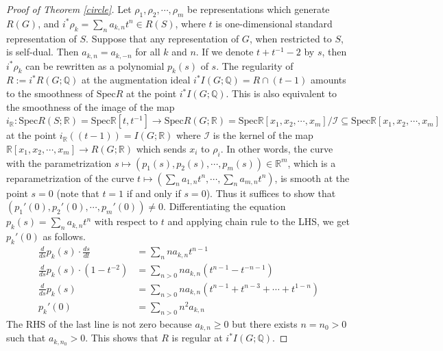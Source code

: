 \documentclass[10pt,a4paper]{amsart}
\begin{document}
\begin{proof}[Proof of Theorem \ref{circle}] Let $\rho_1, \rho_2, \cdots, \rho_m$ be representations which generate $R(G)$, and $\displaystyle i^*\rho_k=\sum_{n}a_{k, n}t^n\in R(S)$, where $t$ is one-dimensional standard representation of $S$. Suppose that any representation of $G$, when restricted to $S$, is self-dual. Then $a_{k, n}=a_{k, -n}$ for all $k$ and $n$. If we denote $t+t^{-1}-2$ by $s$, then $i^*\rho_k$ can be rewritten as a polynomial $p_k(s)$ of $s$. The regularity of $R:=i^*R(G; \mathbb{Q})$ at the augmentation ideal $i^*I(G; \mathbb{Q})=R\cap (t-1)$ amounts to the smoothness of $\text{Spec} R$ at the point $i^*I(G; \mathbb{Q})$. This is also equivalent to the smoothness of the image of the map $i_\mathbb{R}: \text{Spec} R(S; \mathbb{R})=\text{Spec}\mathbb{R}[t, t^{-1}]\to \text{Spec} R(G; \mathbb{R})=\text{Spec}\mathbb{R}[x_1, x_2, \cdots, x_{m}]/\mathcal{I}\subseteq\text{Spec}\mathbb{R}[x_1, x_2, \cdots, x_m]$ at the point $i_\mathbb{R}((t-1))=I(G; \mathbb{R})$ where $\mathcal{I}$ is the kernel of the map $\mathbb{R}[x_1, x_2, \cdots, x_m]\to R(G; \mathbb{R})$ which sends $x_i$ to $\rho_i$. In other words, the curve with the parametrization $s\mapsto (p_1(s), p_2(s), \cdots, p_m(s))\in\mathbb{R}^m$, which is a reparametrization of the curve $\displaystyle t\mapsto \left(\sum_n a_{1, n}t^n, \cdots, \sum_n a_{m, n}t^n\right)$, is smooth at the point $s=0$ (note that $t=1$ if and only if $s=0$). Thus it suffices to show that $(p_1'(0), p_2'(0), \cdots, p_m'(0))\neq 0$. Differentiating the equation $\displaystyle p_k(s)=\sum_n a_{k, n}t^n$ with respect to $t$ and applying chain rule to the LHS, we get $p_k'(0)$ as follows.
\begin{align*}
	\frac{d}{ds}p_k(s)\cdot\frac{ds}{dt}&=\sum_n na_{k, n}t^{n-1}\\
	\frac{d}{ds}p_k(s)\cdot (1-t^{-2})&=\sum_{n>0}na_{k, n}(t^{n-1}-t^{-n-1})\\
	\frac{d}{ds}p_k(s)&=\sum_{n>0}na_{k, n}(t^{n-1}+t^{n-3}+\cdots+t^{1-n})\\
	p_k'(0)&=\sum_{n>0}n^2a_{k, n}
\end{align*}
The RHS of the last line is not zero because $a_{k, n}\geq 0$ but there exists $n=n_0>0$ such that $a_{k, n_0}>0$. This shows that $R$ is regular at $i^*I(G; \mathbb{Q})$. 


\end{proof}
\end{document}
